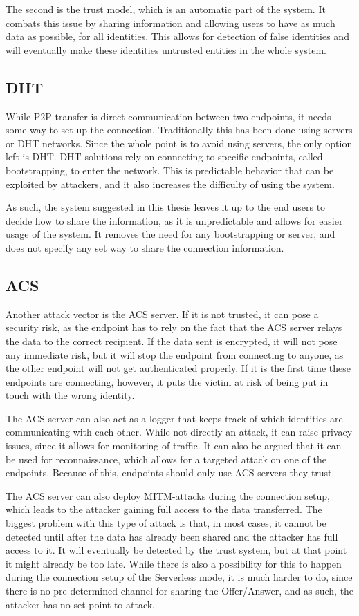   The second is the trust model, which is an automatic part of the system. It combats this issue by sharing information and allowing users to have as much data as possible, for all identities. This allows for detection of false identities and will eventually make these identities untrusted entities in the whole system.
%
  \subsection{DHT}
  While P2P transfer is direct communication between two endpoints, it needs some way to set up the connection. Traditionally this has been done using servers or DHT networks. Since the whole point is to avoid using servers, the only option left is DHT. DHT solutions rely on connecting to specific endpoints, called bootstrapping, to enter the network. This is predictable behavior that can be exploited by attackers, and it also increases the difficulty of using the system.

  As such, the system suggested in this thesis leaves it up to the end users to decide how to share the information, as it is unpredictable and allows for easier usage of the system. It removes the need for any bootstrapping or server, and does not specify any set way to share the connection information.
  
  \subsection{ACS}
  Another attack vector is the ACS server. If it is not trusted, it can pose a security risk, as the endpoint has to rely on the fact that the ACS server relays the data to the correct recipient. If the data sent is encrypted, it will not pose any immediate risk, but it will stop the endpoint from connecting to anyone, as the other endpoint will not get authenticated properly. If it is the first time these endpoints are connecting, however, it puts the victim at risk of being put in touch with the wrong identity.

  The ACS server can also act as a logger that keeps track of which identities are communicating with each other. While not directly an attack, it can raise privacy issues, since it allows for monitoring of traffic. It can also be argued that it can be used for reconnaissance, which allows for a targeted attack on one of the endpoints. Because of this, endpoints should only use ACS servers they trust.

  The ACS server can also deploy MITM-attacks during the connection setup, which leads to the attacker gaining full access to the data transferred. The biggest problem with this type of attack is that, in most cases, it cannot be detected until after the data has already been shared and the attacker has full access to it. It will eventually be detected by the trust system, but at that point it might already be too late. While there is also a possibility for this to happen during the connection setup of the Serverless mode, it is much harder to do, since there is no pre-determined channel for sharing the Offer/Answer, and as such, the attacker has no set point to attack. 
%

